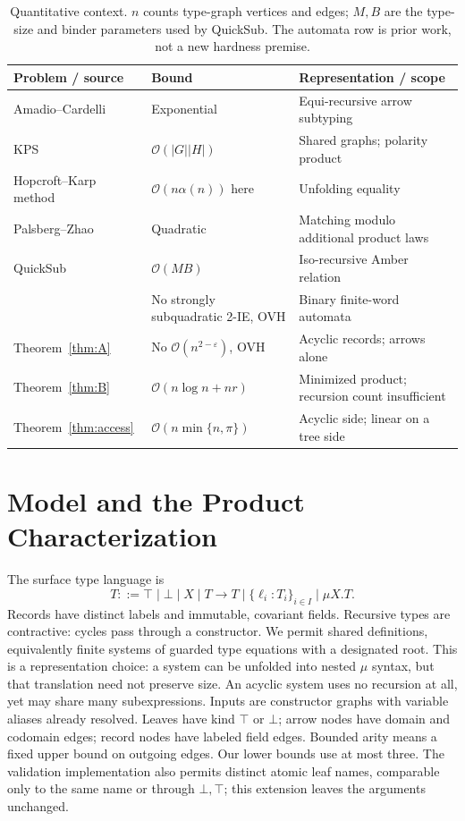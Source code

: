 \documentclass[11pt,letterpaper]{article}
\theoremstyle{definition}\newtheorem{definition}[theorem]{Definition}
\newcommand{\Oh}{\mathcal O}
\newcommand{\rec}[1]{\{#1\}}
\begin{document}
\begin{table}[H]
\caption{Quantitative context. $n$ counts type-graph vertices and edges; $M,B$ are the type-size and binder parameters used by QuickSub. The automata row is prior work, not a new hardness premise.}
\label{tab:map}
\centering
\begin{tabular}{p{}p{}p{}}
\toprule
Problem / source & Bound & Representation / scope\\\midrule
Amadio--Cardelli~\cite{AC93} & Exponential & Equi-recursive arrow subtyping\\
KPS~\cite{KPS93,KPS95} & $\Oh(|G||H|)$ & Shared graphs; polarity product\\
Hopcroft--Karp method~\cite{HK71} & $\Oh(n\alpha(n))$ here & Unfolding equality\\
Palsberg--Zhao~\cite{PZ01} & Quadratic & Matching modulo additional product laws\\
QuickSub~\cite{QuickSub25} & $\Oh(MB)$ & Iso-recursive Amber relation\\
\cite[Lemma 6.4]{DDFMW25} & No strongly subquadratic 2-IE, OVH & Binary finite-word automata\\\midrule
Theorem~\ref{thm:A} & No $\Oh(n^{2-\varepsilon})$, OVH & Acyclic records; arrows alone\\
Theorem~\ref{thm:B} & $\Oh(n\log n+nr)$ & Minimized product; recursion count insufficient\\
Theorem~\ref{thm:access} & $\Oh(n\min\{n,\pi\})$ & Acyclic side; linear on a tree side\\
\bottomrule
\end{tabular}
\end{table}
\FloatBarrier

\section{Model and the Product Characterization}\label{sec:model}
The surface type language is
\[
 T::=\top\mid\bot\mid X\mid T\to T\mid\rec{\ell_i:T_i}_{i\in I}\mid\mu X.T.
\]
Records have distinct labels and immutable, covariant fields. Recursive types are contractive: cycles pass through a constructor. We permit shared definitions, equivalently finite systems of guarded type equations with a designated root. This is a representation choice: a system can be unfolded into nested $\mu$ syntax, but that translation need not preserve size. An acyclic system uses no recursion at all, yet may share many subexpressions. Inputs are constructor graphs with variable aliases already resolved. Leaves have kind $\top$ or $\bot$; arrow nodes have domain and codomain edges; record nodes have labeled field edges. Bounded arity means a fixed upper bound on outgoing edges. Our lower bounds use at most three. The validation implementation also permits distinct atomic leaf names, comparable only to the same name or through $\bot,\top$; this extension leaves the arguments unchanged.
\end{document}
